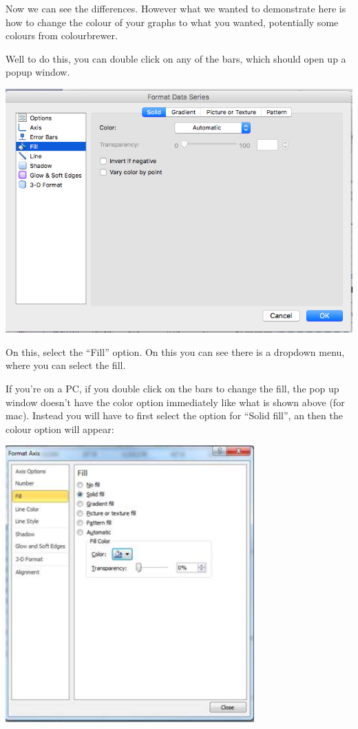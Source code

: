 \documentclass[
]{book}
\begin{document}
Now we can see the differences. However what we wanted to demonstrate here is how to change the colour of your graphs to what you wanted, potentially some colours from colourbrewer.

Well to do this, you can double click on any of the bars, which should open up a popup window.

\includegraphics{imgs/manual_fill_1.png}

On this, select the ``Fill'' option. On this you can see there is a dropdown menu, where you can select the fill.

If you're on a PC, if you double click on the bars to change the fill, the pop up window doesn't have the color option immediately like what is shown above (for mac). Instead you will have to first select the option for ``Solid fill'', an then the colour option will appear:

\includegraphics{imgs/pc_solid_fill.png}
\end{document}
